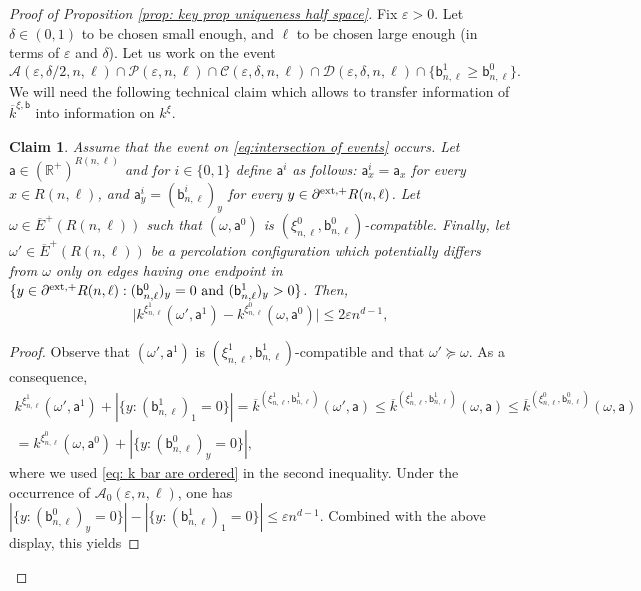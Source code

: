 \documentclass[11pt,a4paper]{article}
\numberwithin{equation}{section}
\theoremstyle{plain}
\newtheorem{Claim}[Thm]{Claim}
\theoremstyle{definition}
\begin{document}
\begin{proof}[Proof of Proposition \textup{\ref{prop: key prop uniqueness half space}}]
Fix $\varepsilon>0$. Let $\delta\in (0,1)$ to be chosen small enough, and $\ell$ to be chosen large enough (in terms of $\varepsilon$ and $\delta$). Let us work on the event 
\begin{equation}\label{eq:intersection of events}
\mathcal A(\varepsilon,\delta/2,n,\ell)\cap \mathcal P(\varepsilon,n,\ell)\cap \mathcal C(\varepsilon,\delta,n,\ell) \cap \mathcal D(\varepsilon, \delta, n,\ell)\cap \{\mathsf{b}_{n,\ell}^1\geq \mathsf{b}_{n,\ell}^0\}.
\end{equation}
We will need the following technical claim which allows to transfer information of $\overline{k}^{\xi,\mathsf{b}}$ into information on $k^\xi$.

\begin{Claim}\label{claim: from k bar to k} Assume that the event on \eqref{eq:intersection of events} occurs. Let $\mathsf{a}\in (\mathbb R^+)^{R(n,\ell)}$ and for $i \in \{0,1\}$ define $\mathsf{a}^i$ as follows: $\mathsf{a}_x^i=\mathsf{a}_x$ for every $x\in R(n,\ell)$, and $\mathsf{a}^i_y=(\mathsf{b}_{n,\ell}^i)_y$ for every $y\in \partial^{\textup{ext},+}R(n,\ell)$. Let $\omega\in \overline{E}^+(R(n,\ell))$ such that $(\omega,\mathsf{a}^0)$ is $(\xi_{n,\ell}^0,\mathsf{b}_{n,\ell}^0)$-compatible. Finally, let $\omega'\in \overline{E}^+(R(n,\ell))$ be a percolation configuration which potentially differs from $\omega$ only on edges having one endpoint in $\{y\in \partial^{\textup{ext},+}R(n,\ell):(\mathsf{b}^0_{n,\ell})_y=0 \textup{ and }(\mathsf{b}_{n,\ell}^1)_y>0\}$. Then,
 \begin{equation}
    \Big|k^{\xi^1_{n,\ell}}(\omega',\mathsf{a}^1)-k^{\xi^0_{n,\ell}}(\omega,\mathsf{a}^0)\Big|\leq 2\varepsilon n^{d-1},
\end{equation}
\end{Claim}
\begin{proof} Observe that $(\omega',\mathsf{a}^1)$ is $(\xi^1_{n,\ell},\mathsf{b}_{n,\ell}^1)$-compatible and that $\omega'\succcurlyeq \omega$. As a consequence,
\begin{multline}
    k^{\xi^1_{n,\ell}}(\omega',\mathsf{a}^1)+|\{y: (\mathsf{b}^1_{n,\ell})_1=0\}|= \overline{k}^{(\xi^1_{n,\ell},\mathsf{b}^1_{n,\ell})}(\omega',\mathsf{a})\leq \overline{k}^{(\xi^1_{n,\ell},\mathsf{b}^1_{n,\ell})}(\omega,\mathsf{a})\leq \overline{k}^{(\xi^0_{n,\ell},\mathsf{b}^0_{n,\ell})}(\omega,\mathsf{a})\\= k^{\xi^0_{n,\ell}}(\omega,\mathsf{a}^0)+|\{y: (\mathsf{b}^0_{n,\ell})_y=0\}|,
\end{multline}
where we used \eqref{eq: k bar are ordered} in the second inequality. Under the occurrence of $\mathcal{A}_0(\varepsilon,n,\ell)$, one has $|\{y: (\mathsf{b}^0_{n,\ell})_y=0\}|-|\{y: (\mathsf{b}^1_{n,\ell})_1=0\}|\leq \varepsilon n^{d-1}$. Combined with the above display, this yields

\end{proof}
\end{proof}
\end{document}
